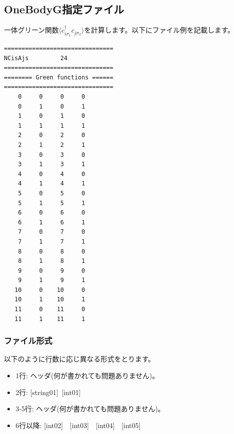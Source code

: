 \newpage
\subsection{OneBodyG指定ファイル}
\label{Subsec:onebodyg}
一体グリーン関数$\langle c_{i\sigma_1}^{\dagger}c_{j\sigma_2}\rangle$を計算します。以下にファイル例を記載します。

\begin{minipage}{12.5cm}
\begin{screen}
\begin{verbatim}
===============================
NCisAjs         24
===============================
======== Green functions ======
===============================
    0     0     0     0
    0     1     0     1
    1     0     1     0
    1     1     1     1
    2     0     2     0
    2     1     2     1
    3     0     3     0
    3     1     3     1
    4     0     4     0
    4     1     4     1
    5     0     5     0
    5     1     5     1
    6     0     6     0
    6     1     6     1
    7     0     7     0
    7     1     7     1
    8     0     8     0
    8     1     8     1
    9     0     9     0
    9     1     9     1
   10     0    10     0
   10     1    10     1
   11     0    11     0
   11     1    11     1
\end{verbatim}
\end{screen}
\end{minipage}

\subsubsection{ファイル形式}
以下のように行数に応じ異なる形式をとります。
 \begin{itemize}
   \item  1行:  ヘッダ(何が書かれても問題ありません)。
   \item  2行:   [string01]~[int01]
   \item  3-5行:  ヘッダ(何が書かれても問題ありません)。
   \item  6行以降: [int02]~~[int03]~~[int04]~~[int05]
  \end{itemize}
